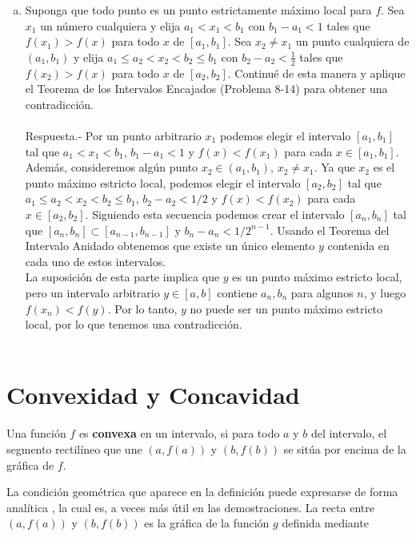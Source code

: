 \begin{enumerate}[\bfseries 1.]
\begin{enumerate}[(a)]
	\item Suponga que todo punto es un punto estrictamente máximo local para $f$. Sea $x_1$ un número cualquiera y elija $a_1 < x_1 < b_1$ con $b_1 -a_1 < 1$ tales que $f(x_1) > f(x)$ para todo $x$ de $[a_1, b_1]$. Sea $x_2\neq x_1$ un punto cualquiera de $(a_1, b_1)$ y elija $a_1 \leq a_2 < x_2 < b_2 \leq b_1$ con $b_2-a_2<\frac{1}{2}$ tales que $f(x_2) > f(x)$ para todo $x$ de $[a_2,b_2]$. Continué de esta manera y aplique el Teorema de los Intervalos Encajados (Problema 8-14) para obtener una contradicción.\\\\
	    Respuesta.-\; Por un punto arbitrario $x_1$ podemos elegir el intervalo $[a_1,b_1]$ tal que $a_1<x_1<b_1$, $b_1-a_1<1$ y $f(x)<f(x_1)$ para cada $x\in [a_1,b_1]$. Además, consideremos algún punto $x_2\in (a_1,b_1)$, $x_2\neq x_1$. Ya que $x_2$ es el punto máximo estricto local, podemos elegir el intervalo $[a_2,b_2]$ tal que $a_1\leq a_2<x_2<b_2\leq b_1$, $b_2-a_2<1/2$ y $f(x)<f(x_2)$ para cada $x\in [a_2,b_2]$. Siguiendo esta secuencia podemos crear el intervalo $[a_n,b_n]$ tal que $[a_n,b_n]\subset [a_{n-1},b_{n-1}]$ y $b_n-a_n<1/2^{n-1}$. Usando el Teorema del Intervalo Anidado obtenemos que existe un único elemento  $y$ contenida en cada uno de estos intervalos.\\
	    La suposición de esta parte implica que $y$ es un punto máximo estricto local, pero un intervalo arbitrario $y\in [a,b]$ contiene $a_n,b_n$ para algunos $n$, y luego $f(x_n)<f(y)$. Por lo tanto, $y$ no puede ser un punto máximo estricto local, por lo que tenemos una contradicción.\\\\
	\end{enumerate}

	
\end{enumerate}


\appendix
\chapter{Convexidad y Concavidad}

\begin{def.}
    Una función $f$ es \textbf{convexa} en un intervalo, si para todo $a$ y $b$ del intervalo, el segmento rectilíneo que une $\left(a,f(a)\right)$ y $\left(b,f(b)\right)$ se sitúa por encima de la gráfica de $f.$
\end{def.}

La condición geométrica que aparece en la definición puede expresarse de forma analítica , la cual es, a veces más útil en las demostraciones. La recta entre $(a,f(a))$ y $(b,f(b))$ es la gráfica de la función $g$ definida mediante

